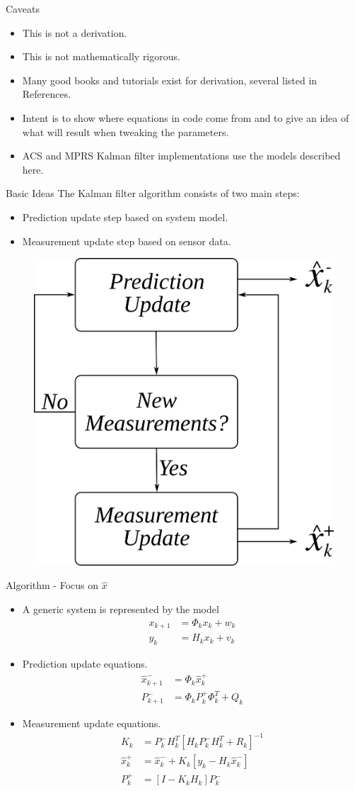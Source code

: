 \documentclass[hyperref={pdfpagelabels=false}]{beamer}
\begin{document}
\begin{frame}{Caveats}
\begin{itemize}
\item This is not a derivation.
\item This is not mathematically rigorous.
\item Many good books and tutorials exist for derivation, several listed in References.
\item Intent is to show where equations in code come from and to give an idea of what will result when tweaking the parameters.
\item ACS and MPRS Kalman filter implementations use the models described here.
\end{itemize}
\end{frame}

\begin{frame}{Basic Ideas}
The Kalman filter algorithm consists of two main steps:
\begin{itemize}
\item Prediction update step based on system model.
\item Measurement update step based on sensor data.
\end{itemize}
\begin{figure}[ht!]
	\centering
	\includegraphics[width=.3\textwidth]{images/kf}
\end{figure}
\end{frame}

\begin{frame}{Algorithm - Focus on $\hat{x}$}
\begin{itemize}
\item A generic system is represented by the model
\begin{align*}
x_{k+1} &= \Phi_kx_k + w_k \\
y_k &= H_kx_k + v_k
\end{align*}
\item Prediction update equations.
\begin{align*}
\hat{x}_{k+1}^- &= \Phi_k\hat{x}_k^+ \\
P_{k+1}^- &= \Phi_kP_k^+\Phi_k^T + Q_k
\end{align*}
\item Measurement update equations.
\begin{align*}
K_k &= P_k^-H_k^T\left[H_kP_k^-H_k^T + R_k\right]^{-1} \\
\hat{x}_k^+ &= \hat{x}_k^- + K_k\left[y_k - H_k\hat{x}_k^-\right] \\
P_k^+ &= \left[I - K_kH_k\right]P_k^-
\end{align*}
\end{itemize}
\end{frame}
\end{document}
